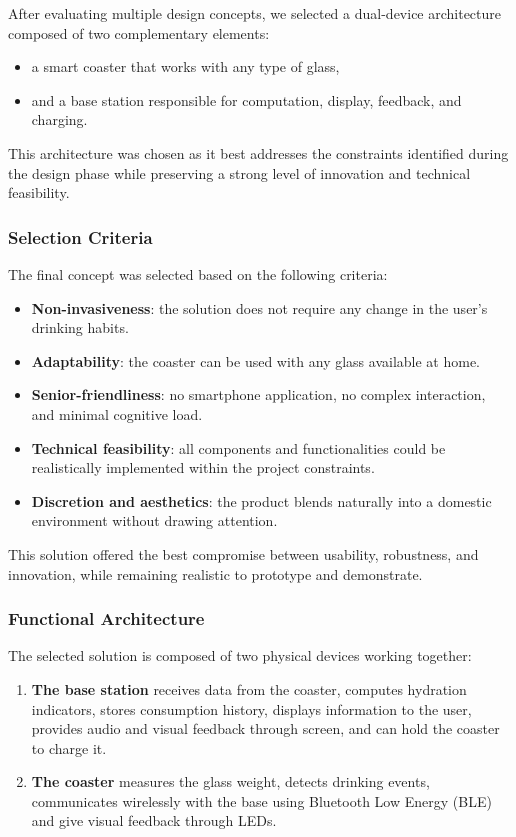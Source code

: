 \documentclass{article}
\begin{document}
After evaluating multiple design concepts, we selected a dual-device architecture composed of two complementary elements:
\begin{itemize}
    \item a smart coaster that works with any type of glass,
    \item and a base station responsible for computation, display, feedback, and charging.
\end{itemize}

This architecture was chosen as it best addresses the constraints identified during the design phase while preserving a strong level of innovation and technical feasibility.

\subsubsection*{Selection Criteria}

The final concept was selected based on the following criteria:
\begin{itemize}
    \item \textbf{Non-invasiveness}: the solution does not require any change in the user’s drinking habits.
    \item \textbf{Adaptability}: the coaster can be used with any glass available at home.
    \item \textbf{Senior-friendliness}: no smartphone application, no complex interaction, and minimal cognitive load.
    \item \textbf{Technical feasibility}: all components and functionalities could be realistically implemented within the project constraints.
    \item \textbf{Discretion and aesthetics}: the product blends naturally into a domestic environment without drawing attention.
\end{itemize}

This solution offered the best compromise between usability, robustness, and innovation, while remaining realistic to prototype and demonstrate.

\subsubsection*{Functional Architecture}

The selected solution is composed of two physical devices working together:

\begin{enumerate}
    \item \textbf{The base station} receives data from the coaster, computes hydration indicators, stores consumption history, displays information to the user, provides audio and visual feedback through screen, and can hold the coaster to charge it.
    \item \textbf{The coaster} measures the glass weight, detects drinking events, communicates wirelessly with the base using Bluetooth Low Energy (BLE) and give visual feedback through LEDs. 
\end{enumerate}
\end{document}
